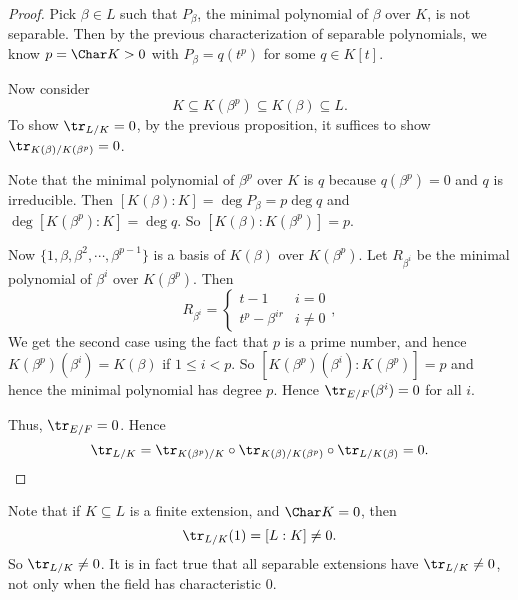 \documentclass[a4paper]{article}
\begin{document}
\begin{proof}
  Pick $\beta \in L$ such that $P_\beta$, the minimal polynomial of $\beta$ over $K$, is not separable. Then by the previous characterization of separable polynomials, we know $p = \Char K > 0$ with $P_\beta = q(t^p)$ for some $q \in K[t]$.

  Now consider
  \[
    K \subseteq K(\beta^p) \subseteq K(\beta) \subseteq L.
  \]
  To show $\tr_{L/K} = 0$, by the previous proposition, it suffices to show $\tr_{K(\beta)/K(\beta^p)} = 0$.

  Note that the minimal polynomial of $\beta^p$ over $K$ is $q$ because $q(\beta^p) = 0$ and $q$ is irreducible. Then $[K(\beta):K] = \deg P_\beta = p \deg q$ and $\deg[K(\beta^p):K] = \deg q$. So $[K(\beta):K(\beta^p)] = p$.

  Now $\{1, \beta, \beta^2, \cdots, \beta^{p - 1}\}$ is a basis of $K(\beta)$ over $K(\beta^p)$. Let $R_{\beta^i}$ be the minimal polynomial of $\beta^i$ over $K(\beta^p)$. Then
  \[
    R_{\beta^i} =
    \begin{cases}
      t - 1 & i = 0\\
      t^p - \beta^{ir} & i \not=0
    \end{cases},
  \]
  We get the second case using the fact that $p$ is a prime number, and hence $K(\beta^p)(\beta^i) = K(\beta)$ if $1 \leq i < p$. So $[K(\beta^p)(\beta^i):K(\beta^p)] = p$ and hence the minimal polynomial has degree $p$. Hence $\tr_{E/F} (\beta^i) = 0$ for all $i$.

  Thus, $\tr_{E/F} = 0$. Hence
  \[
    \tr_{L/K} = \tr_{K(\beta^p)/K} \circ \tr_{K(\beta)/K(\beta^p)} \circ \tr_{L/K(\beta)} = 0.
  \]
\end{proof}
Note that if $K \subseteq L$ is a finite extension, and $\Char K = 0$, then
\[
  \tr_{L/K}(1) = [L:K] \not= 0.
\]
So $\tr_{L/K} \not= 0$. It is in fact true that all separable extensions have $\tr_{L/K} \not= 0$, not only when the field has characteristic $0$.
\end{document}
